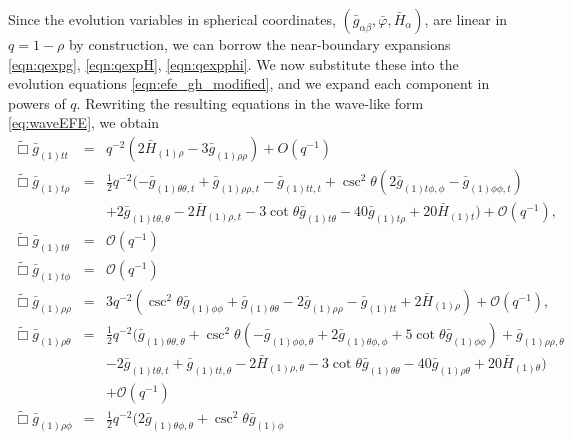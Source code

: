 \documentclass[a4paper,11pt]{article}
\numberwithin{equation}{section}
\begin{document}
Since the evolution variables in spherical coordinates, $(\bar{g}_{\alpha\beta},\bar{\varphi},\bar{H}_\alpha)$, are linear in $q=1-\rho$ by construction, we can borrow the near-boundary expansions \eqref{eqn:qexpg}, \eqref{eqn:qexpH}, \eqref{eqn:qexpphi}. 
We now substitute these into the evolution equations \eqref{eqn:efe_gh_modified}, and we expand each component in powers of $q$. Rewriting the resulting equations in the wave-like form \eqref{eq:waveEFE}, we obtain
\begin{eqnarray}\label{eqn:efett_3p1}
\tilde{\Box}\bar{g}_{(1)tt}&=&q^{-2} \left(2 \bar{H}_{(1) \rho }-3 \bar{g}_{(1) \rho \rho }\right)+O\left(q^{-1}\right)\\
%
\label{eqn:efetrho_3p1}
\tilde{\Box}\bar{g}_{(1)t\rho}&=&\frac{1}{2}q^{-2} (-\bar{g}_{(1)\theta \theta,t}+\bar{g}_{(1) \rho \rho ,t}-\bar{g}_{(1)
  \text{$tt$},t}+\csc ^2\theta \left(2 \bar{g}_{(1) \text{$t$$\phi $},\phi }-\bar{g}_{(1)
  \phi \phi ,t}\right) \nonumber\\
   &&+2 \bar{g}_{(1) \text{$t$$\theta $},\theta }-2 \bar{H}_{(1) \rho ,t}-3
   \cot \theta  \bar{g}_{(1) \text{$t$$\theta $}}-40 \bar{g}_{(1) \text{$t$$\rho $}}+20
   \bar{H}_{(1) t}) +\mathcal{O}(q^{-1}),\\
%
\label{eqn:efettheta_3p1}
\tilde{\Box}\bar{g}_{(1)t\theta}&=&\mathcal{O}(q^{-1})\\
%
\label{eqn:efetphi_3p1}
\tilde{\Box}\bar{g}_{(1)t\phi}&=&\mathcal{O}(q^{-1})\\
%
\label{eqn:eferhorho_3p1}
\tilde{\Box}\bar{g}_{(1)\rho\rho}&=&3q^{-2} \left(\csc ^2\theta \bar{g}_{(1) \phi \phi }+\bar{g}_{(1)\theta \theta}-2 \bar{g}_{(1)
   \rho \rho }-\bar{g}_{(1) \text{$tt$}}+2 \bar{H}_{(1) \rho }\right)+\mathcal{O}(q^{-1}),\\
% 
\label{eqn:eferhotheta_3p1}
\tilde{\Box}\bar{g}_{(1)\rho\theta}&=&\frac{1}{2} q^{-2}(\bar{g}_{(1)\theta \theta,\theta }+\csc ^2\theta \left(-\bar{g}_{(1)
   \phi \phi ,\theta }+2 \bar{g}_{(1)\theta \phi,\phi }+5 \cot \theta  \bar{g}_{(1) \phi
   \phi }\right)+\bar{g}_{(1) \rho \rho ,\theta }\nonumber\\
   &&-2 \bar{g}_{(1) \text{$t$$\theta
   $},t}+\bar{g}_{(1) \text{$tt$},\theta }-2 \bar{H}_{(1) \rho ,\theta }-3 \cot \theta 
   \bar{g}_{(1)\theta \theta}-40 \bar{g}_{(1) \rho \theta }+20 \bar{H}_{(1)\theta})\nonumber\\
   &&+\mathcal{O}(q^{-1})\\
% 
\label{eqn:eferhophi_3p1}
\tilde{\Box}\bar{g}_{(1)\rho\phi}&=&\frac{1}{2} q^{-2}(2 \bar{g}_{(1)\theta \phi,\theta }+\csc ^2\theta \bar{g}_{(1) \phi
}
\end{eqnarray}
\end{document}
